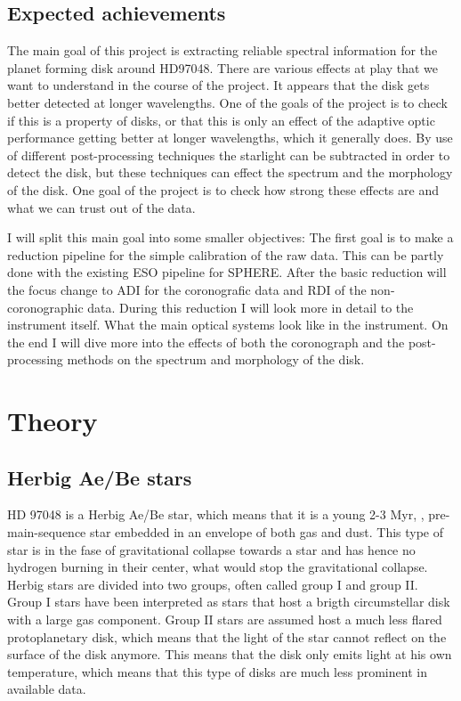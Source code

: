 \documentclass[twoside,single]{lion-msc}
\begin{document}
\section{Expected achievements}
The main goal of this project is extracting reliable spectral information for the planet forming disk around HD97048. There are various effects at play that we want to understand in the course of the project. It appears that the disk gets better detected at longer wavelengths. One of the goals of the project is to check if this is a property of disks, or that this is only an effect of the adaptive optic performance getting better at longer wavelengths, which it generally does. By use of different post-processing techniques the starlight can be subtracted in order to detect the disk, but these techniques can effect the spectrum and the morphology of the disk. One goal of the project is to check how strong these effects are and what we can trust out of the data.
\bigskip

I will split this main goal into some smaller objectives: The first goal is to make a reduction pipeline for the simple calibration of the raw data. This can be partly done with the existing ESO pipeline for SPHERE. After the basic reduction will the focus change to ADI for the coronografic data and RDI of the non-coronographic data. During this reduction I will look more in detail to the instrument itself. What the main optical systems look like in the instrument. On the end I will dive more into the effects of both the coronograph and the post-processing methods on the spectrum and morphology of the disk.

\chapter{Theory}
\section{Herbig Ae/Be stars}
HD 97048 is a Herbig Ae/Be star, which means that it is a young 2-3 Myr, \cite{VanDenAncker1998}, pre-main-sequence star embedded in an envelope of both gas and dust. This type of star is in the fase of gravitational collapse towards a star and has hence no hydrogen burning in their center, what would stop the gravitational collapse. Herbig stars are divided into two groups, often called group I and group II. Group I stars have been interpreted as stars that host a brigth circumstellar disk with a large gas component. Group II stars are assumed host a much less flared protoplanetary disk, which means that the light of the star cannot reflect on the surface of the disk anymore. This means that the disk only emits light at his own temperature, which means that this type of disks are much less prominent in available data.
\bigskip 
\end{document}
